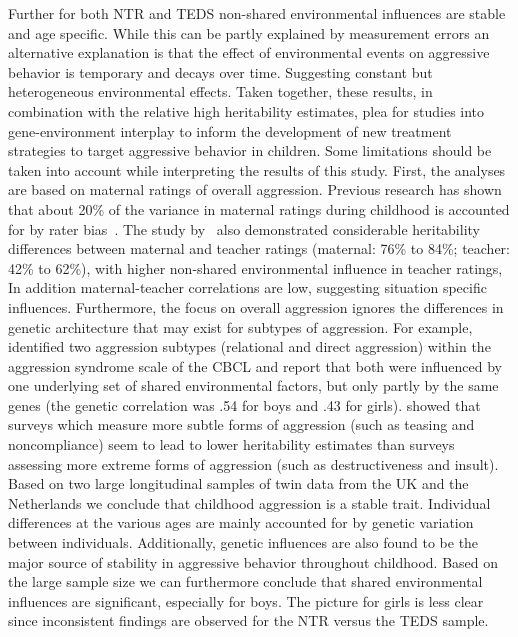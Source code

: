 Further for both NTR and TEDS non-shared environmental influences are stable and age specific.
While this can be partly explained by measurement errors an alternative explanation is that the effect of environmental events on aggressive behavior is temporary and decays over time.
Suggesting constant but heterogeneous environmental effects.
Taken together, these results, in combination with the relative high heritability estimates, plea for studies into gene-environment interplay to inform the development of new treatment strategies	to target aggressive behavior in children.
Some limitations should be taken into account while interpreting the results of this study.  First, the analyses are based on maternal ratings of overall aggression.
Previous research has shown that about 20\% of the variance in maternal ratings during childhood is accounted for by rater bias~\cite{Bartels2007}.
The study by~\citet{Haberstick2006} also demonstrated considerable heritability differences between maternal and teacher ratings (maternal: 76\% to 84\%; teacher: 42\% to 62\%), with higher non-shared environmental influence in teacher ratings, In addition maternal-teacher correlations are low, suggesting situation specific influences.
Furthermore, the focus on overall aggression ignores the differences in genetic architecture that may exist for subtypes of aggression.
For example,~\citet{Ligthart2005} identified two aggression subtypes (relational and direct aggression) within the aggression syndrome scale of the CBCL and report that both were influenced by one underlying set of shared environmental factors, but only partly by the same genes (the genetic correlation was .54 for boys and .43 for girls).
\citet{Ghodsian1987} showed that surveys which measure more subtle forms of aggression (such as teasing and noncompliance) seem to lead to lower heritability estimates than surveys assessing more extreme forms of aggression (such as destructiveness and insult).
Based on two large longitudinal samples of twin data from the UK and the Netherlands we conclude that childhood aggression is a stable trait.
Individual differences at the various ages are mainly accounted for by genetic variation between individuals.
Additionally, genetic influences are also found to be the major source of stability in aggressive behavior throughout childhood.
Based on the large sample size we can furthermore conclude that shared environmental influences are significant, especially for boys.
The picture for girls is less clear since inconsistent findings are observed for the NTR versus the TEDS sample.
